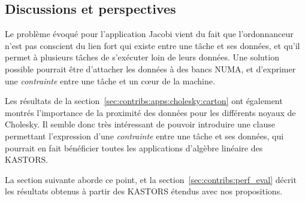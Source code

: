 \subsection{Discussions et perspectives}

Le problème évoqué pour l'application Jacobi vient du fait que l'ordonnanceur n'est pas conscient du lien fort qui existe entre une tâche et ses données, et qu'il permet à plusieurs tâches de s'exécuter loin de leurs données. Une solution possible pourrait être d'attacher les données à des bancs NUMA, et d'exprimer une \emph{contrainte} entre une tâche et un cœur de la machine.

Les résultats de la section~\ref{sec:contribs:apps:cholesky:carton} ont également montrés l'importance de la proximité des données pour les différents noyaux de Cholesky.
Il semble donc très intéressant de pouvoir introduire une clause permettant l'expression d'une \emph{contrainte} entre une tâche et ses données, qui pourrait en fait bénéficier toutes les applications d'algèbre linéaire des KASTORS.

La section suivante aborde ce point, et la section~\ref{sec:contribs:perf_eval} décrit les résultats obtenus à partir des KASTORS étendus avec nos propositions.

